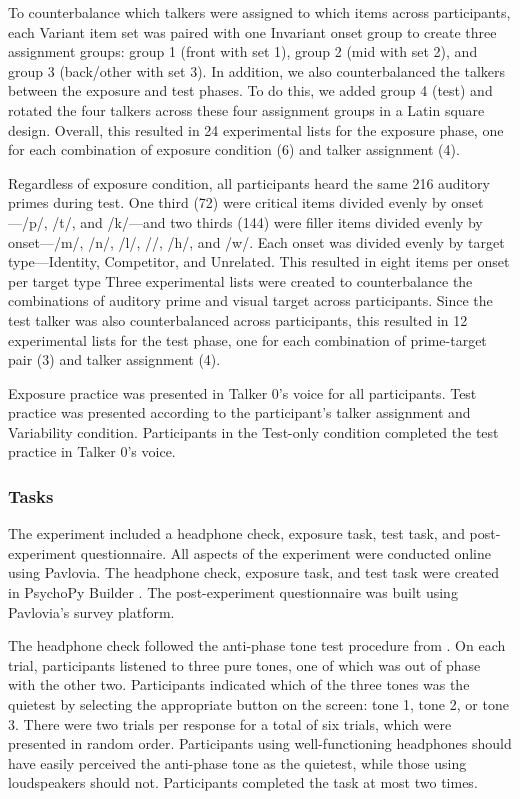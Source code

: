 \documentclass[preprint, 3p, authoryear]{elsarticle} %
\begin{document}
To counterbalance which talkers were assigned to which items across participants, each Variant item set was paired with one Invariant onset group to create three assignment groups: group 1 (front with set 1), group 2 (mid with set 2), and group 3 (back/other with set 3).
In addition, we also counterbalanced the talkers between the exposure and test phases.
To do this, we added group 4 (test) and rotated the four talkers across these four assignment groups in a Latin square design.
Overall, this resulted in 24 experimental lists for the exposure phase, one for each combination of exposure condition (6) and talker assignment (4).

Regardless of exposure condition, all participants heard the same 216 auditory primes during test.
One third (72) were critical items divided evenly by onset---/p/, /t/, and /k/---and two thirds (144) were filler items divided evenly by onset---/m/, /n/, /l/, //, /h/, and /w/.
Each onset was divided evenly by target type---Identity, Competitor, and Unrelated.
This resulted in eight items per onset per target type
Three experimental lists were created to counterbalance the combinations of auditory prime and visual target across participants.
Since the test talker was also counterbalanced across participants, this resulted in 12 experimental lists for the test phase, one for each combination of prime-target pair (3) and talker assignment (4).

Exposure practice was presented in Talker 0's voice for all participants.
Test practice was presented according to the participant's talker assignment and Variability condition.
Participants in the Test-only condition completed the test practice in Talker 0's voice.

\hypertarget{methods-tasks-1a}{%
\subsubsection{Tasks}\label{methods-tasks-1a}}

The experiment included a headphone check, exposure task, test task, and post-experiment questionnaire.
All aspects of the experiment were conducted online using Pavlovia.
The headphone check, exposure task, and test task were created in PsychoPy Builder \citep{peirce2019}.
The post-experiment questionnaire was built using Pavlovia's survey platform.

The headphone check followed the anti-phase tone test procedure from \citet{woods2017}.
On each trial, participants listened to three pure tones, one of which was out of phase with the other two.
Participants indicated which of the three tones was the quietest by selecting the appropriate button on the screen: tone 1, tone 2, or tone 3.
There were two trials per response for a total of six trials, which were presented in random order.
Participants using well-functioning headphones should have easily perceived the anti-phase tone as the quietest, while those using loudspeakers should not.
Participants completed the task at most two times.
\end{document}
